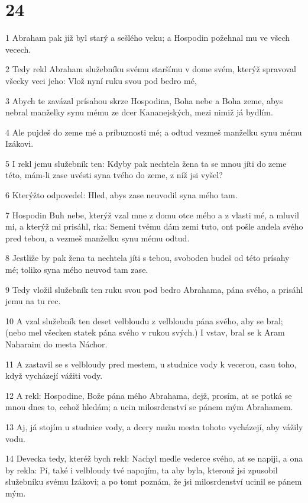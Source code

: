 \chapter{24}

\par 1 Abraham pak již byl starý a sešlého veku; a Hospodin požehnal mu ve všech vecech.
\par 2 Tedy rekl Abraham služebníku svému staršímu v dome svém, kterýž spravoval všecky veci jeho: Vlož nyní ruku svou pod bedro mé,
\par 3 Abych te zavázal prísahou skrze Hospodina, Boha nebe a Boha zeme, abys nebral manželky synu mému ze dcer Kananejských, mezi nimiž já bydlím.
\par 4 Ale pujdeš do zeme mé a príbuznosti mé; a odtud vezmeš manželku synu mému Izákovi.
\par 5 I rekl jemu služebník ten: Kdyby pak nechtela žena ta se mnou jíti do zeme této, mám-li zase uvésti syna tvého do zeme, z níž jsi vyšel?
\par 6 Kterýžto odpovedel: Hled, abys zase neuvodil syna mého tam.
\par 7 Hospodin Buh nebe, kterýž vzal mne z domu otce mého a z vlasti mé, a mluvil mi, a kterýž mi prisáhl, rka: Semeni tvému dám zemi tuto, ont pošle andela svého pred tebou, a vezmeš manželku synu mému odtud.
\par 8 Jestliže by pak žena ta nechtela jíti s tebou, svoboden budeš od této prísahy mé; toliko syna mého neuvod tam zase.
\par 9 Tedy vložil služebník ten ruku svou pod bedro Abrahama, pána svého, a prisáhl jemu na tu rec.
\par 10 A vzal služebník ten deset velbloudu z velbloudu pána svého, aby se bral; (nebo mel všecken statek pána svého v rukou svých.) I vstav, bral se k Aram Naharaim do mesta Náchor.
\par 11 A zastavil se s velbloudy pred mestem, u studnice vody k vecerou, casu toho, když vycházejí vážiti vody.
\par 12 A rekl: Hospodine, Bože pána mého Abrahama, dejž, prosím, at se potká se mnou dnes to, cehož hledám; a ucin milosrdenství se pánem mým Abrahamem.
\par 13 Aj, já stojím u studnice vody, a dcery mužu mesta tohoto vycházejí, aby vážily vodu.
\par 14 Devecka tedy, kteréž bych rekl: Nachyl medle vederce svého, at se napiji, a ona by rekla: Pí, také i velbloudy tvé napojím, ta aby byla, kterouž jsi zpusobil služebníku svému Izákovi; a po tomt poznám, že jsi milosrdenství ucinil se pánem mým.
